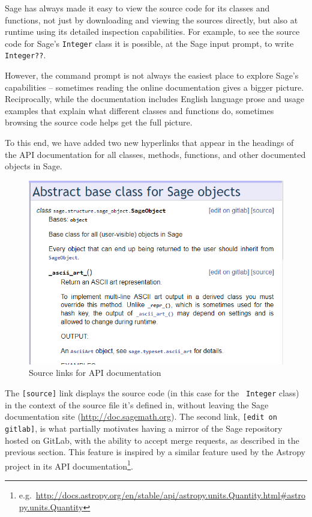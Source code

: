 {Sage has always made it easy to view the source code for its classes and
functions, not just by downloading and viewing the sources directly, but
also at runtime using its detailed inspection capabilities.  For example, to
see the source code for Sage's {\tt Integer} class it is possible, at the
Sage input prompt, to write {\tt Integer??}.


However, the command prompt is not always the easiest place to explore
Sage's capabilities -- sometimes reading the online documentation
gives a bigger picture. Reciprocally, while the documentation includes
English language prose and usage examples that explain what different
classes and functions do, sometimes browsing the source code helps get
the full picture.

To this end, we have added two new hyperlinks that appear in the headings of
the API documentation for all classes, methods, functions, and other documented
objects in Sage.


\begin{figure}[!ht]
    \centering
    \includegraphics{screenshots/source-links}
    \caption{Source links for API documentation}
    \label{fig:source-links}
\end{figure}

The {\tt [source]} link displays the source code (in this case for the {\tt
Integer} class)  in the context of the source file it's defined in, without
leaving the Sage documentation site (\url{http://doc.sagemath.org}).  The
second link, {\tt [edit on gitlab]}, is what partially motivates having a
mirror of the Sage repository hosted on GitLab, with the ability to accept
merge requests, as described in the previous section.  This feature is inspired
by a similar feature used by the Astropy project in its API
documentation\footnote{e.g.~\url{http://docs.astropy.org/en/stable/api/astropy.units.Quantity.html\#astropy.units.Quantity}}.

}
